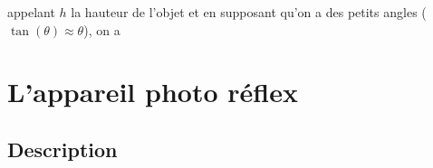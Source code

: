 \documentclass[../../main/main.tex]{subfiles}
\begin{document}
\begin{tcbraster}[raster columns=3, raster equal height=rows]
\begin{tcolorbox}[blankest, raster multicolumn=1]
\begin{tcbraster}[raster columns=1]
\begin{tcb}[label=demo_gross-loupe]
				appelant $h$ la hauteur de l'objet et en supposant qu'on a des
				petits angles ($\tan(\theta)\approx\theta$), on a
			\end{tcb}
		\end{tcbraster}
	\end{tcolorbox}
\end{tcbraster}

\section{L'appareil photo réflex}

\subsection{Description}
\end{document}
